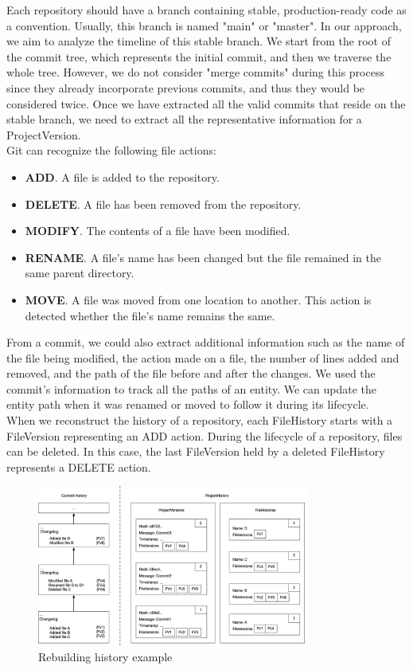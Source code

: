 Each repository should have a branch containing stable, production-ready code as a convention. Usually, this branch is named "main" or "master". 
In our approach, we aim to analyze the timeline of this stable branch. We start from the root of the commit tree, which represents the initial commit, and then we traverse the whole tree. 
However, we do not consider "merge commits" during this process since they already incorporate previous commits, and thus they would be considered twice. 
Once we have extracted all the valid commits that reside on the stable branch, we need to extract all the representative information for a ProjectVersion. \\

Git can recognize the following file actions:
\begin{itemize}
    \item \textbf{ADD}. A file is added to the repository.
    \item \textbf{DELETE}. A file has been removed from the repository.
    \item \textbf{MODIFY}. The contents of a file have been modified.
    \item \textbf{RENAME}. A file's name has been changed but the file remained in the same parent directory.
    \item \textbf{MOVE}. A file was moved from one location to another. This action is detected whether the file's name remains the same. 
\end{itemize}

From a commit, we could also extract additional information such as the name of the file being modified, the action made on a file, the number of lines added and removed, and the path of the file before and after the changes.
We used the commit's information to track all the paths of an entity. We can update the entity path when it was renamed or moved to follow it during its lifecycle. \\
When we reconstruct the history of a repository, each FileHistory starts with a FileVersion representing an ADD action.
During the lifecycle of a repository, files can be deleted. In this case, the last FileVersion held by a deleted FileHistory represents a DELETE action.

\begin{figure}
    \begin{center}
        \includegraphics[width=0.8\textwidth]{RebuildingHistory.jpg}
    \end{center}
    \caption{Rebuilding history example}
    \label{fig:RebuildingHistory}
\end{figure}

